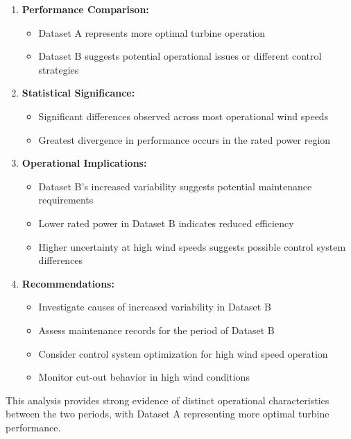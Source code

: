 \documentclass[a4paper,11pt]{article}
\begin{document}
\begin{enumerate}
    \item \textbf{Performance Comparison:}
    \begin{itemize}
        \item Dataset A represents more optimal turbine operation
        \item Dataset B suggests potential operational issues or different control strategies
    \end{itemize}

    \item \textbf{Statistical Significance:}
    \begin{itemize}
        \item Significant differences observed across most operational wind speeds
        \item Greatest divergence in performance occurs in the rated power region
    \end{itemize}

    \item \textbf{Operational Implications:}
    \begin{itemize}
        \item Dataset B's increased variability suggests potential maintenance requirements
        \item Lower rated power in Dataset B indicates reduced efficiency
        \item Higher uncertainty at high wind speeds suggests possible control system differences
    \end{itemize}

    \item \textbf{Recommendations:}
    \begin{itemize}
        \item Investigate causes of increased variability in Dataset B
        \item Assess maintenance records for the period of Dataset B
        \item Consider control system optimization for high wind speed operation
        \item Monitor cut-out behavior in high wind conditions
    \end{itemize}
\end{enumerate}

This analysis provides strong evidence of distinct operational characteristics between the two periods, with Dataset A representing more optimal turbine performance.
 
\end{document}
